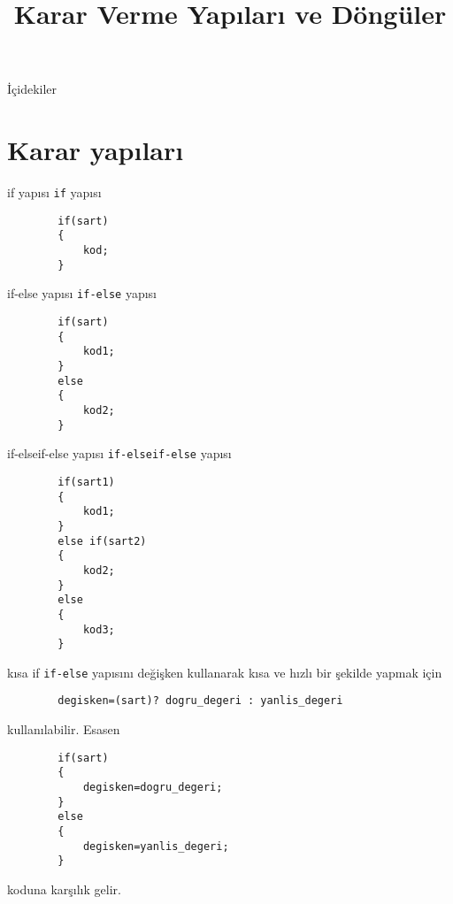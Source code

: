 
\title[Ders 3] {Karar Verme Yapıları ve Döngüler}

\frame{\titlepage}
\begin{frame}[fragile]{İçidekiler}
    \tableofcontents
\end{frame}
\section{Karar yapıları}
\begin{frame}[fragile]{if yapısı}
    \lstinline{if} yapısı
    \begin{lstlisting}
        if(sart)
        {
            kod;
        }\end{lstlisting}
\end{frame}
\begin{frame}[fragile]{if-else yapısı}
    \lstinline{if-else} yapısı
    \begin{lstlisting}
        if(sart)
        {
            kod1;
        }
        else
        {
            kod2;
        }\end{lstlisting}
\end{frame}
\begin{frame}[fragile]{if-elseif-else yapısı}
    \lstinline{if-elseif-else} yapısı
    \begin{lstlisting}
        if(sart1)
        {
            kod1;
        }
        else if(sart2)
        {
            kod2;
        }
        else
        {
            kod3;
        }\end{lstlisting}
\end{frame}
\begin{frame}[fragile]{kısa if}
    \lstinline{if-else} yapısını değişken kullanarak kısa ve hızlı bir şekilde yapmak için
    \begin{lstlisting}
        degisken=(sart)? dogru_degeri : yanlis_degeri\end{lstlisting}
    kullanılabilir. Esasen
    \begin{lstlisting}
        if(sart)
        {
            degisken=dogru_degeri;
        }
        else
        {
            degisken=yanlis_degeri;
        }\end{lstlisting}
    koduna karşılık gelir.
\end{frame}
